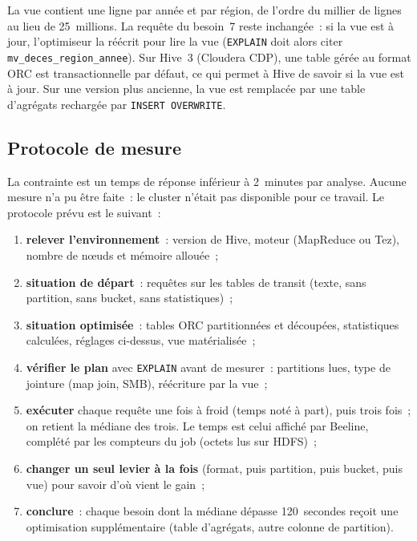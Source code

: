 \noindent La vue contient une ligne par année et par région, de l'ordre du millier de lignes au lieu de 25~millions. La requête du besoin~7 reste inchangée~: si la vue est à jour, l'optimiseur la réécrit pour lire la vue (\texttt{EXPLAIN} doit alors citer \texttt{mv\_deces\_region\_annee}). Sur Hive~3 (Cloudera CDP), une table gérée au format ORC est transactionnelle par défaut, ce qui permet à Hive de savoir si la vue est à jour. Sur une version plus ancienne, la vue est remplacée par une table d'agrégats rechargée par \texttt{INSERT OVERWRITE}.

\subsection{Protocole de mesure}

\noindent La contrainte est un temps de réponse inférieur à 2~minutes par analyse. Aucune mesure n'a pu être faite~: le cluster n'était pas disponible pour ce travail. Le protocole prévu est le suivant~:
\begin{enumerate}
	\item \textbf{relever l'environnement}~: version de Hive, moteur (MapReduce ou Tez), nombre de n\oe uds et mémoire allouée~;
	\item \textbf{situation de départ}~: requêtes sur les tables de transit (texte, sans partition, sans bucket, sans statistiques)~;
	\item \textbf{situation optimisée}~: tables ORC partitionnées et découpées, statistiques calculées, réglages ci-dessus, vue matérialisée~;
	\item \textbf{vérifier le plan} avec \texttt{EXPLAIN} avant de mesurer~: partitions lues, type de jointure (map join, SMB), réécriture par la vue~;
	\item \textbf{exécuter} chaque requête une fois à froid (temps noté à part), puis trois fois~; on retient la médiane des trois. Le temps est celui affiché par Beeline, complété par les compteurs du job (octets lus sur HDFS)~;
	\item \textbf{changer un seul levier à la fois} (format, puis partition, puis bucket, puis vue) pour savoir d'où vient le gain~;
	\item \textbf{conclure}~: chaque besoin dont la médiane dépasse 120~secondes reçoit une optimisation supplémentaire (table d'agrégats, autre colonne de partition).
\end{enumerate}

